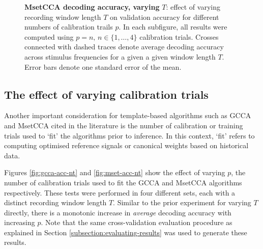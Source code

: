\begin{figure}[htp]
\caption[MsetCCA decoding accuracy, varying $T$: effect of varying recording window length $T$ on validation accuracy for different numbers of calibration trails $p$]{\textbf{MsetCCA decoding accuracy, varying }$T$: effect of varying recording window length $T$ on validation accuracy for different numbers of calibration trails $p$. In each subfigure, all results were computed using $p=n, \, n\in\{1, \dots, 4\}$ calibration trials. Crosses connected with dashed traces denote average decoding accuracy across stimulus frequencies for a given a given window length $T$. Error bars denote one standard error of the mean.}
\label{fig:mcca-acc-ns}
\end{figure}

\subsection{The effect of varying calibration trials}
\label{subsection:decoding-acc-ntr-effect}
Another important consideration for template-based algorithms such as GCCA and MsetCCA cited in the literature is the number of calibration or training trials used to `fit' the algorithms prior to inference. In this context, `fit' refers to computing optimised reference signals or canonical weights based on historical data. 

Figures \ref{fig:gcca-acc-nt} and \ref{fig:mset-acc-nt} show the effect of varying $p$, the number of calibration trials used to fit the GCCA and MsetCCA algorithms respectively. These tests were performed in four different sets, each with a distinct recording window length $T$. Similar to the prior experiment for varying $T$ directly, there is a monotonic increase in \textit{average} decoding accuracy with increasing $p$. Note that the same cross-validation evaluation procedure as explained in Section \ref{subsection:evaluating-results} was used to generate these results.

